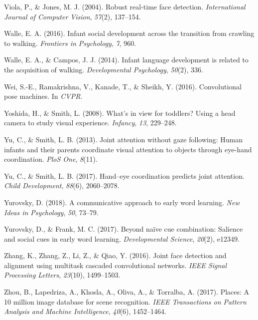 \documentclass[english,man]{apa6}
\begin{document}
\hypertarget{ref-viola2004robust}{}
Viola, P., \& Jones, M. J. (2004). Robust real-time face detection.
\emph{International Journal of Computer Vision}, \emph{57}(2), 137--154.

\hypertarget{ref-walle2016infant}{}
Walle, E. A. (2016). Infant social development across the transition
from crawling to walking. \emph{Frontiers in Psychology}, \emph{7}, 960.

\hypertarget{ref-walle2014}{}
Walle, E. A., \& Campos, J. J. (2014). Infant language development is
related to the acquisition of walking. \emph{Developmental Psychology},
\emph{50}(2), 336.

\hypertarget{ref-wei2016cpm}{}
Wei, S.-E., Ramakrishna, V., Kanade, T., \& Sheikh, Y. (2016).
Convolutional pose machines. In \emph{CVPR}.

\hypertarget{ref-yoshida2008}{}
Yoshida, H., \& Smith, L. (2008). What's in view for toddlers? Using a
head camera to study visual experience. \emph{Infancy}, \emph{13},
229--248.

\hypertarget{ref-yu2013joint}{}
Yu, C., \& Smith, L. B. (2013). Joint attention without gaze following:
Human infants and their parents coordinate visual attention to objects
through eye-hand coordination. \emph{PloS One}, \emph{8}(11).

\hypertarget{ref-yu2017hand}{}
Yu, C., \& Smith, L. B. (2017). Hand--eye coordination predicts joint
attention. \emph{Child Development}, \emph{88}(6), 2060--2078.

\hypertarget{ref-yurovsky2018communicative}{}
Yurovsky, D. (2018). A communicative approach to early word learning.
\emph{New Ideas in Psychology}, \emph{50}, 73--79.

\hypertarget{ref-yurovsky2017beyond}{}
Yurovsky, D., \& Frank, M. C. (2017). Beyond naïve cue combination:
Salience and social cues in early word learning. \emph{Developmental
Science}, \emph{20}(2), e12349.

\hypertarget{ref-zhang2016}{}
Zhang, K., Zhang, Z., Li, Z., \& Qiao, Y. (2016). Joint face detection
and alignment using multitask cascaded convolutional networks.
\emph{IEEE Signal Processing Letters}, \emph{23}(10), 1499--1503.

\hypertarget{ref-zhou2017places}{}
Zhou, B., Lapedriza, A., Khosla, A., Oliva, A., \& Torralba, A. (2017).
Places: A 10 million image database for scene recognition. \emph{IEEE
Transactions on Pattern Analysis and Machine Intelligence},
\emph{40}(6), 1452--1464.

\endgroup
\end{document}
